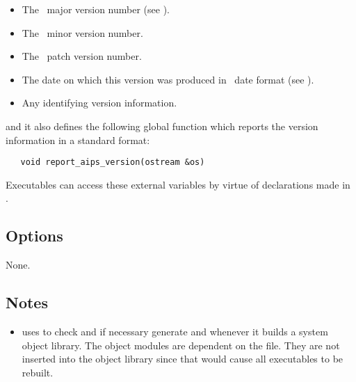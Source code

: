 \begin{itemize}
\item
    The \aipspp\ major version number
   (see ).

\item
    The \aipspp\ minor version number.

\item
    The \aipspp\ patch version number.

\item
    The date on which this version was
   produced in \aipspp\ date format (see ).

\item
    Any identifying version
   information.
\end{itemize}
 
\noindent
and it also defines the following global function which reports the version
information in a standard format:

\begin{verbatim}
   void report_aips_version(ostream &os)
\end{verbatim}

\noindent
Executables can access these external variables by virtue of declarations
made in .

\subsection*{Options}
 
None.
 
\subsection*{Notes}
 
\begin{itemize}
\item
    uses  to check and if necessary generate
    and  whenever it
   builds a system object library.  The  object modules are
   dependent on the  file.  They are not inserted
   into the object library since that would cause all executables to be
   rebuilt.
\end{itemize}
 

